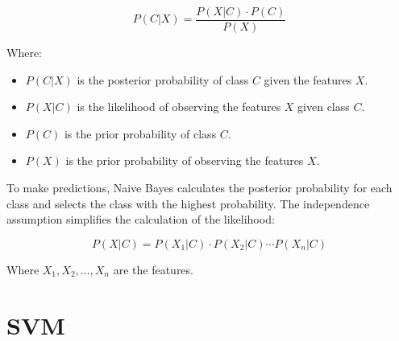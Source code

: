 \[
P(C | X) = \frac{P(X | C) \cdot P(C)}{P(X)}
\]

Where:
\begin{itemize}
    \item \( P(C | X) \) is the posterior probability of class \( C \) given the features \( X \).
    \item \( P(X | C) \) is the likelihood of observing the features \( X \) given class \( C \).
    \item \( P(C) \) is the prior probability of class \( C \).
    \item \( P(X) \) is the prior probability of observing the features \( X \).
\end{itemize}

To make predictions, Naive Bayes calculates the posterior probability for each class and selects the class with the highest probability. The independence assumption simplifies the calculation of the likelihood:

\[
P(X | C) = P(X_1 | C) \cdot P(X_2 | C) \cdots P(X_n | C)
\]

Where \( X_1, X_2, \ldots, X_n \) are the features.






\section{SVM}